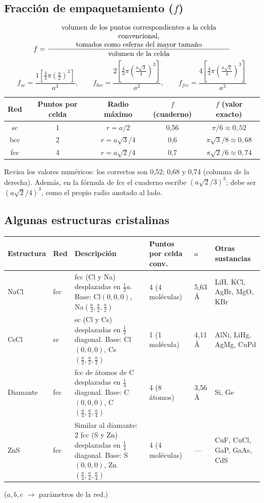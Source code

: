 \documentclass[11pt,a4paper]{article}
\begin{document}
\subsection{Fracción de empaquetamiento ($f$)}
\[
f=\frac{\parbox{9cm}{\centering volumen de los puntos correspondientes a la celda convencional,\\ tomados como esferas del mayor tamaño}}{\text{volumen de la celda}}
\]
\[
f_{sc}=\frac{1\left[\frac43\pi\left(\frac a2\right)^3\right]}{a^3},\qquad
f_{bcc}=\frac{2\left[\frac43\pi\left(\frac{a\sqrt3}{4}\right)^3\right]}{a^3},\qquad
f_{fcc}=\frac{4\left[\frac43\pi\left(\frac{a\sqrt2}{4}\right)^3\right]}{a^3}
\]
\begin{center}
\begin{tabular}{ccccc}
\toprule
Red & Puntos por celda & Radio máximo & $f$ (cuaderno) & $f$ (valor exacto)\\
\midrule
sc & 1 & $r=a/2$ & 0,56 & $\pi/6\approx0{,}52$\\
bcc & 2 & $r=a\sqrt3/4$ & 0,6 & $\pi\sqrt3/8\approx0{,}68$\\
fcc & 4 & $r=a\sqrt2/4$ & 0,7 & $\pi\sqrt2/6\approx0{,}74$\\
\bottomrule
\end{tabular}
\end{center}

\begin{obs}
Revisa los valores numéricos: los correctos son 0,52; 0,68 y 0,74 (columna de la derecha). Además, en la fórmula de fcc el
cuaderno escribe $(a\sqrt2/3)^3$; debe ser $(a\sqrt2/4)^3$, como el propio radio anotado al lado.
\end{obs}

\subsection{Algunas estructuras cristalinas}
\begin{center}
\footnotesize
\renewcommand{\arraystretch}{1.35}
\begin{tabularx}{\textwidth}{@{}l l >{\raggedright\arraybackslash}X l l >{\raggedright\arraybackslash}X@{}}
\toprule
Estructura & Red & Descripción & Puntos por celda conv. & $a$ & Otras sustancias\\
\midrule
NaCl & fcc & 2 fcc (Cl y Na) desplazadas en $\tfrac12a$. Base: Cl$(0,0,0)$, Na$(\tfrac a2,\tfrac a2,\tfrac a2)$ & 4 (4 moléculas) & 5,63 Å & LiH, KCl, AgBr, MgO, KBr\\
CsCl & sc & 2 sc (Cl y Cs) desplazadas en $\tfrac12$ diagonal. Base: Cl$(0,0,0)$, Cs$(\tfrac a2,\tfrac a2,\tfrac a2)$ & 1 (1 molécula) & 4,11 Å & AlNi, LiHg, AgMg, CuPd\\
Diamante & fcc & 2 fcc de átomos de C desplazadas en $\tfrac14$ diagonal. Base: C$(0,0,0)$, C$(\tfrac a4,\tfrac a4,\tfrac a4)$ & 4 (8 átomos) & 3,56 Å & Si, Ge\\
ZnS & fcc & Similar al diamante: 2 fcc (S y Zn) desplazadas en $\tfrac14$ diagonal. Base: S$(0,0,0)$, Zn$(\tfrac a4,\tfrac a4,\tfrac a4)$ & 4 (4 moléculas) & --- & CuF, CuCl, GaP, GaAs, CdS\\
\bottomrule
\end{tabularx}
\end{center}
($a,b,c$ $\rightarrow$ parámetros de la red.)
\end{document}
